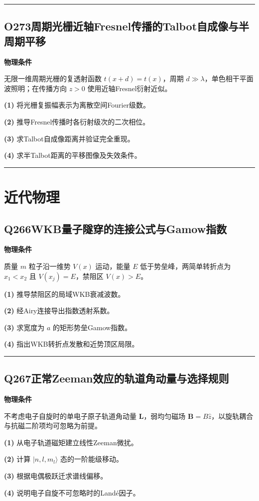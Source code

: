 \documentclass[UTF8,a4paper,11pt,oneside,openany]{ctexbook}
\begin{document}
\par\bigskip\hrule\bigskip
\section*{O273\quad 周期光栅近轴Fresnel传播的Talbot自成像与半周期平移}
\textbf{物理条件}\par 无限一维周期光栅的复透射函数 \(t(x+d)=t(x)\)，周期 \(d\gg\lambda\)，单色相干平面波照明；在传播方向 \(z>0\) 使用近轴Fresnel衍射近似。
\par\noindent\textbf{(1)} 将光栅复振幅表示为离散空间Fourier级数。
\par\noindent\textbf{(2)} 推导Fresnel传播时各衍射级次的二次相位。
\par\noindent\textbf{(3)} 求Talbot自成像距离并验证完全重现。
\par\noindent\textbf{(4)} 求半Talbot距离的平移图像及失效条件。

\par\bigskip\hrule\bigskip
\chapter{近代物理}
\section*{Q266\quad WKB量子隧穿的连接公式与Gamow指数}
\textbf{物理条件}\par 质量 \(m\) 粒子沿一维势 \(V(x)\) 运动，能量 \(E\) 低于势垒峰，两简单转折点为 \(x_1<x_2\) 且 \(V(x_j)=E\)，禁阻区 \(V(x)>E\)。
\par\noindent\textbf{(1)} 推导禁阻区的局域WKB衰减波数。
\par\noindent\textbf{(2)} 经Airy连接导出指数透射系数。
\par\noindent\textbf{(3)} 求宽度为 \(a\) 的矩形势垒Gamow指数。
\par\noindent\textbf{(4)} 指出WKB转折点发散和近势顶区局限。

\par\bigskip\hrule\bigskip
\section*{Q267\quad 正常Zeeman效应的轨道角动量与选择规则}
\textbf{物理条件}\par 不考虑电子自旋时的单电子原子轨道角动量 \(\boldsymbol L\)，弱均匀磁场 \(\boldsymbol B=B\hat z\)，以旋轨耦合与抗磁二阶项均可忽略为前提。
\par\noindent\textbf{(1)} 从电子轨道磁矩建立线性Zeeman微扰。
\par\noindent\textbf{(2)} 计算 \(|n,l,m_l\rangle\) 态的一阶能级移动。
\par\noindent\textbf{(3)} 根据电偶极跃迁求谱线偏移。
\par\noindent\textbf{(4)} 说明电子自旋不可忽略时的Landé因子。
\end{document}

